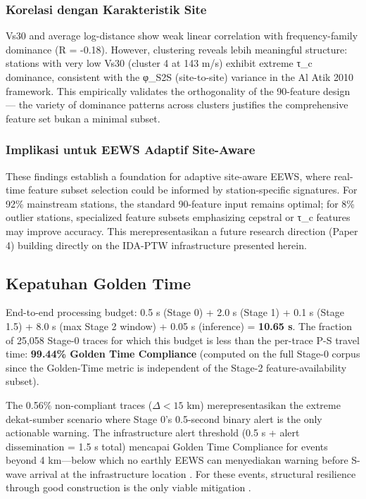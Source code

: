 \documentclass[10pt]{article}
\renewcommand{\cite}[1]{\citep{#1}}
\begin{document}
\subsubsection{Korelasi dengan Karakteristik Site}

Vs30 and average log-distance show weak linear correlation with frequency-family dominance (R = -0.18). However, clustering reveals lebih meaningful structure: stations with very low Vs30 (cluster 4 at 143 m/s) exhibit extreme τ\_c dominance, consistent with the φ\_S2S (site-to-site) variance in the Al Atik 2010 framework. This empirically validates the orthogonality of the 90-feature design --- the variety of dominance patterns across clusters justifies the comprehensive feature set bukan a minimal subset.

\subsubsection{Implikasi untuk EEWS Adaptif Site-Aware}

These findings establish a foundation for adaptive site-aware EEWS, where real-time feature subset selection could be informed by station-specific signatures. For 92\% mainstream stations, the standard 90-feature input remains optimal; for 8\% outlier stations, specialized feature subsets emphasizing cepstral or τ\_c features may improve accuracy. This merepresentasikan a future research direction (Paper 4) building directly on the IDA-PTW infrastructure presented herein.

\subsection{Kepatuhan Golden Time}

End-to-end processing budget: 0.5 s (Stage 0) + 2.0 s (Stage 1) + 0.1 s (Stage 1.5) + 8.0 s (max Stage 2 window) + 0.05 s (inference) = \textbf{10.65 s}. The fraction of 25,058 Stage-0 traces for which this budget is less than the per-trace P-S travel time: \textbf{99.44\% Golden Time Compliance} (computed on the full Stage-0 corpus since the Golden-Time metric is independent of the Stage-2 feature-availability subset).

The 0.56\% non-compliant traces (\(\Delta < 15\) km) merepresentasikan the extreme dekat-sumber scenario where Stage 0's 0.5-second binary alert is the only actionable warning. The infrastructure alert threshold (0.5 s + alert dissemination = 1.5 s total) mencapai Golden Time Compliance for events beyond 4 km---below which no earthly EEWS can menyediakan warning before S-wave arrival at the infrastructure location \cite{ref19}. For these events, structural resilience through good construction is the only viable mitigation \cite{ref14}.
\end{document}
